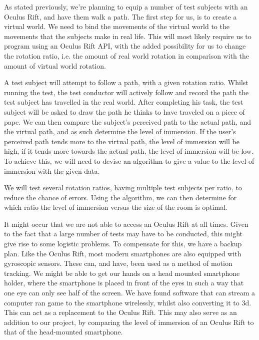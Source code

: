 As stated previously, we're planning to equip a number of test subjects with an Oculus Rift, and have them walk a path.
The first step for us, is to create a virtual world.
We need to bind the movements of the virtual world to the movements that the subjects make in real life.
This will most likely require us to program using an Oculus Rift API, with the added possibility for us to change the rotation ratio, i.e. the amount of real world rotation in comparison with the amount of virtual world rotation.

A test subject will attempt to follow a path, with a given rotation ratio.
Whilst running the test, the test conductor will actively follow and record the path the test subject has travelled in the real world. After completing his task, the test subject will be asked to draw the path he thinks to have traveled on a piece of pape.
We can then compare the subject's perceived path to the actual path, and the virtual path, and as such determine the level of immersion.
If the user's perceived path tends more to the virtual path, the level of immersion will be high, if it tends more towards the actual path, the level of immersion will be low.
To achieve this, we will need to devise an algorithm to give a value to the level of immersion with the given data.

We will test several rotation ratios, having multiple test subjects per ratio, to reduce the chance of errors.
Using the algorithm, we can then determine for which ratio the level of immersion versus the size of the room is optimal.

It might occur that we are not able to access an Oculus Rift at all times.
Given to the fact that a large number of tests may have to be conducted, this might give rise to some logistic problems.
To compensate for this, we have a backup plan.
Like the Oculus Rift, most modern smartphones are also equipped with gyroscopic sensors.
These can, and have, been used as a method of motion tracking.
We might be able to get our hands on a head mounted smartphone holder, where the smartphone is placed in front of the eyes in such a way that one eye can only see half of the screen.
We have found software that can stream a computer ran game to the smartphone wirelessly, whilst also converting it to 3d.
This can act as a replacement to the Oculus Rift. This may also serve as an addition to our project, by comparing the level of immersion of an Oculus Rift to that of the head-mounted smartphone.  
